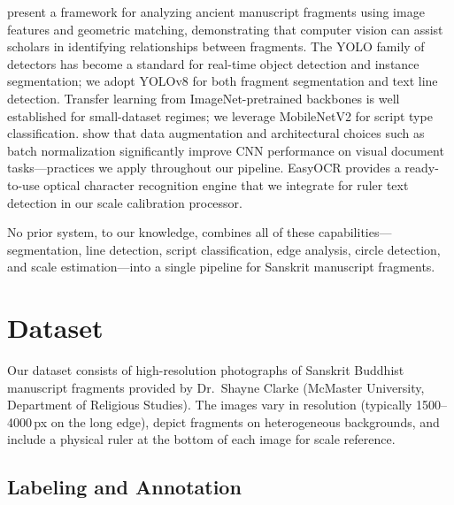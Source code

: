\documentclass[11pt]{article}
\begin{document}
\citet{strauss2018manuscript} present a framework for analyzing ancient manuscript fragments using image features and geometric matching, demonstrating that computer vision can assist scholars in identifying relationships between fragments.
The YOLO family of detectors \citep{redmon2016yolo,jocher2023yolov8} has become a standard for real-time object detection and instance segmentation; we adopt YOLOv8 for both fragment segmentation and text line detection.
Transfer learning from ImageNet-pretrained backbones \citep{deng2009imagenet} is well established for small-dataset regimes; we leverage MobileNetV2 \citep{sandler2018mobilenetv2} for script type classification.
\citet{simard2003bestpractices} show that data augmentation and architectural choices such as batch normalization significantly improve CNN performance on visual document tasks---practices we apply throughout our pipeline.
EasyOCR \citep{jaekyu2019easyocr} provides a ready-to-use optical character recognition engine that we integrate for ruler text detection in our scale calibration processor.

No prior system, to our knowledge, combines all of these capabilities---segmentation, line detection, script classification, edge analysis, circle detection, and scale estimation---into a single pipeline for Sanskrit manuscript fragments.

\section{Dataset}

Our dataset consists of high-resolution photographs of Sanskrit Buddhist manuscript fragments provided by Dr.\ Shayne Clarke (McMaster University, Department of Religious Studies).
The images vary in resolution (typically 1500--4000\,px on the long edge), depict fragments on heterogeneous backgrounds, and include a physical ruler at the bottom of each image for scale reference.

\subsection{Labeling and Annotation}
\end{document}

